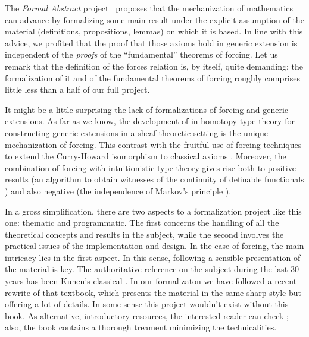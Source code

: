 The \emph{Formal Abstract} project~\cite{hales-fabstracts} proposes
that the mechanization of mathematics can advance by formalizing some
main result under the explicit assumption of the material
(definitions, propositions, lemmas) on which it is based. In line with
this advice, we profited that the proof that those axioms hold in
generic extension is independent of the \emph{proofs} of the
``fundamental'' theorems of forcing. Let us remark that the definition
of the forces relation is, by itself, quite demanding; the
formalization of it and of the fundamental theorems of forcing roughly
comprises little less than a half of our full project.

It might be a little surprising the lack of formalizations of forcing
and generic extensions. As far as we know, the development of
\citet{JFR6232} in homotopy type theory for constructing generic
extensions in a sheaf-theoretic setting is the unique mechanization of
forcing. This contrast with the fruitful use of forcing techniques to
extend the Curry-Howard isomorphism to classical axioms
\cite{Miquel:2011:FPT:2058525.2059614,lmcs:1070}. Moreover, the
combination of forcing with intuitionistic type theory
\cite{coquand2010note} gives rise both to positive results (an
algorithm to obtain witnesses of the continuity of definable
functionals \cite{coquand2012computational}) and also negative
(the independence of Markov's principle \cite{lmcs:3859}).



In a gross simplification, there are two aspects to a formalization
project like this one: thematic and programmatic. The first concerns
the handling of all the theoretical concepts and results in the
subject, while the second involves the practical issues of the
implementation and design. In the case of forcing, the main intricacy
lies in the first aspect. In this sense, following a sensible
presentation of the material is key.  The authoritative reference 
on the subject during the last 30 years has been Kunen's classical
\cite{kunen1980}. In our
formalizaton we have followed a recent rewrite \cite{kunen2011set}
of that  textbook, which presents the material in the same sharp 
style but offering a lot of details. In some sense this project
wouldn't exist without this book. As alternative, introductory
resources, the  interested reader can check
\cite{chow-beginner-forcing}; also, the book \cite{weaver2014forcing}
contains a thorough treament minimizing the technicalities.

